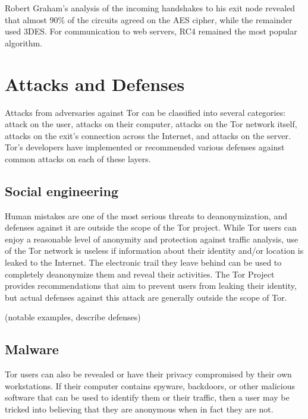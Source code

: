 \documentclass[journal]{IEEEtran}
\begin{document}
Robert Graham's analysis of the incoming handshakes to his exit node revealed that almost 90\% of the circuits agreed on the AES cipher, while the remainder used 3DES. For communication to web servers, RC4 remained the most popular algorithm.\cite{Graham2013}


\section{Attacks and Defenses}

Attacks from adversaries against Tor can be classified into several categories: attack on the user, attacks on their computer, attacks on the Tor network itself, attacks on the exit's connection across the Internet, and attacks on the server. Tor's developers have implemented or recommended various defenses against common attacks on each of these layers.

\subsection{Social engineering}

Human mistakes are one of the most serious threats to deanonymization, and defenses against it are outside the scope of the Tor project. While Tor users can enjoy a reasonable level of anonymity and protection against traffic analysis, use of the Tor network is useless if information about their identity and/or location is leaked to the Internet. The electronic trail they leave behind can be used to completely deanonymize them and reveal their activities. The Tor Project provides recommendations that aim to prevent users from leaking their identity, but actual defenses against this attack are generally outside the scope of Tor.

(notable examples, describe defenses)

\subsection{Malware}

Tor users can also be revealed or have their privacy compromised by their own workstations. If their computer contains spyware, backdoors, or other malicious software that can be used to identify them or their traffic, then a user may be tricked into believing that they are anonymous when in fact they are not.
\end{document}
